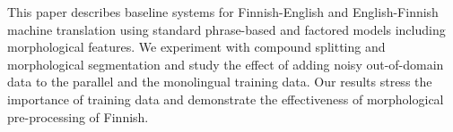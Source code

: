 This paper describes baseline systems for Finnish-English and English-Finnish machine translation using standard phrase-based and factored models including morphological features. We experiment with compound splitting and morphological segmentation and study the effect of adding noisy out-of-domain data to the parallel and the monolingual training data. Our results stress the importance of training data and demonstrate the effectiveness of morphological pre-processing of Finnish.

